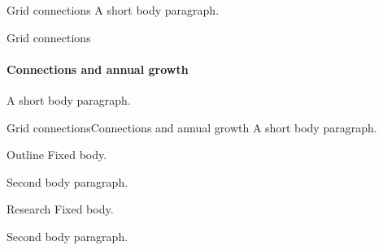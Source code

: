 \documentclass{beamer}
\begin{document}
\begin{frame}{Grid connections}
A short body paragraph.
\end{frame}

\begin{frame}{Grid connections}
\framesubtitle{Connections and annual growth}
A short body paragraph.
\end{frame}

\begin{frame}{Grid connections}{Connections and annual growth}
A short body paragraph.
\end{frame}

\begin{frame}{Outline }
Fixed body.
\pause\par
Second body paragraph.
\end{frame}

\begin{frame}{Research }
Fixed body.
\pause\par
Second body paragraph.
\end{frame}
\end{document}
